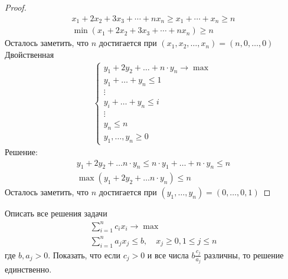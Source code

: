 \begin{proof}
    \begin{gather*}
        x_{1}+2 x_{2}+3 x_{3}+\cdots+n x_{n}
        \geqslant x_{1}+\cdots+x_{n}
        \geqslant n\\ 
        \min(x_{1}+2 x_{2}+3 x_{3}+\cdots+n x_{n}) \geqslant n
    \end{gather*}
    Осталось заметить, что $n$ достигается при $(x_1, x_2, \ldots, x_n) = (n, 0, \ldots, 0)$
    \vskip 0.2in \noindent
    Двойственная
    \begin{gather*}
        \begin{cases}
            y_1 + 2 y_2 +\ldots + n \cdot y_n \to \max\\
            y_1 + \ldots + y_n \leqslant 1\\
            \vdots\\
            y_i + \ldots + y_n \leqslant i\\
            \vdots\\
            y_n \leqslant n\\
            y_1, \ldots, y_n \geqslant 0
        \end{cases}
    \end{gather*}
    Решение:
    \begin{gather*}
        y_1 + 2y_2 + \ldots n \cdot y_n
        \leqslant n \cdot y_1 + \ldots + n \cdot y_n
        \leqslant n\\
        \max(y_1 + 2y_2 + \ldots n \cdot y_n) \leqslant n
    \end{gather*}
    Осталось заметить, что $n$ достигается при $(y_1, \ldots, y_n) = (0, \ldots, 0, 1)$
\end{proof}
\vskip 0.6in




\begin{prob}
    Описать все решения задачи
    \begin{gather*}
        \sum_{i=1}^{n} c_{i} x_{i} \rightarrow \max \\
        \sum_{i=1}^{n} a_{j} x_{j} \leq b,\quad x_{j} \geq 0,1 \leq j \leq n
    \end{gather*}
    где $b, a_{j}>0$. Показать, что если $c_{j}>0$ и все числа $b \frac{c_{j}}{a_{j}}$ различны, то решение единственно.
\end{prob}

